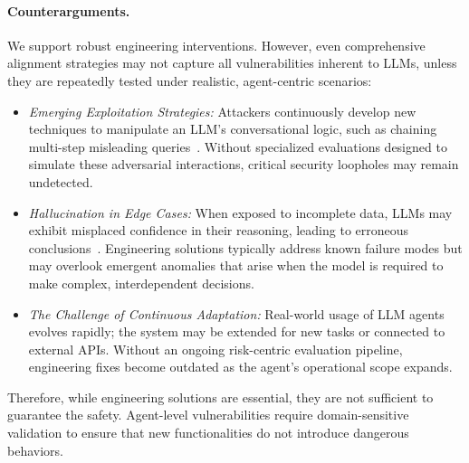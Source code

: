 \paragraph{Counterarguments.}
We support robust engineering interventions. However, even comprehensive alignment strategies may not capture all vulnerabilities inherent to LLMs, unless they are repeatedly tested under realistic, agent-centric scenarios:
\vspace{-5pt}
\begin{itemize}
    \item \emph{Emerging Exploitation Strategies:} 
    Attackers continuously develop new techniques to manipulate an LLM's conversational logic, such as chaining multi-step misleading queries~\citep{xhonneux2024efficient}. Without specialized evaluations designed to simulate these adversarial interactions, critical security loopholes may remain undetected.
    
    \item \emph{Hallucination in Edge Cases:} 
    When exposed to incomplete data, LLMs may exhibit misplaced confidence in their reasoning, leading to erroneous conclusions~\citep{Chen2025EngagingWA}. Engineering solutions typically address known failure modes but may overlook emergent anomalies that arise when the model is required to make complex, interdependent decisions.
    \item \emph{The Challenge of Continuous Adaptation:} Real-world usage of LLM agents evolves rapidly; the system may be extended for new tasks or connected to external APIs. Without an ongoing risk-centric evaluation pipeline, engineering fixes become outdated as the agent's operational scope expands.
\end{itemize}
Therefore, while engineering solutions are essential, they are not sufficient to guarantee the safety. Agent-level vulnerabilities require domain-sensitive validation to ensure that new functionalities do not introduce dangerous behaviors.

